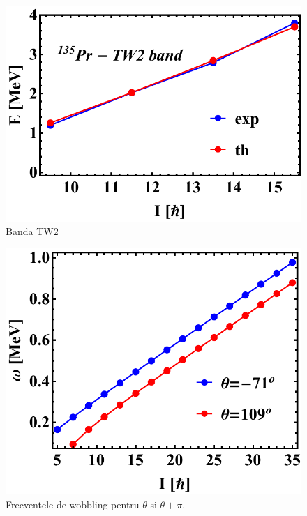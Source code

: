 \documentclass[12pt]{article}
\begin{document}
    \begin{figure}[h]
        \centering
        \includegraphics[scale=0.8]{images/tsd3.pdf}
        \caption{Banda TW2}
    \end{figure}
    \begin{figure}[h]
        \centering
        \includegraphics[scale=0.8]{images/omegas.pdf}
        \caption{Frecventele de wobbling pentru $\theta$ si $\theta+\pi$.}
    \end{figure}
\end{document}
